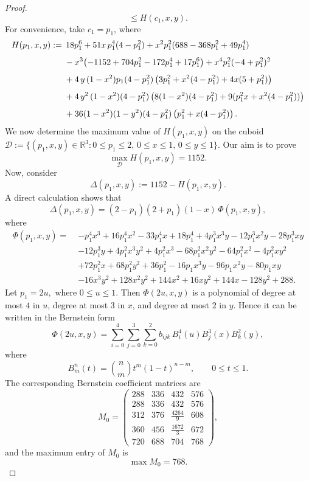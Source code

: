 \documentclass[a4paper,12pt,reqno]{amsart}
\numberwithin{equation}{section}
\begin{document}
\begin{proof}
\[		\le H(c_{1},x,y).
		\]
		For convenience, take $c_{1}=p_{1}$, where
		\begin{align}\label{eq:2.6}
			H(p_{1}, x, y) :=\;
			&\,18 p_{1}^{6}
			+ 51x\,p_{1}^{4}(4 - p_{1}^{2})
			+ x^{2} p_{1}^{2}(688 - 368 p_{1}^{2} + 49 p_{1}^{4}) \notag\\[4pt]
			& - x^{3}\!\left(-1152 + 704 p_{1}^{2} - 172 p_{1}^{4} + 17 p_{1}^{6}\right)
			+ x^{4} p_{1}^{2}(-4 + p_{1}^{2})^{2} \notag\\[4pt]
			& + 4\, y\,(1 - x^{2}) p_{1}(4 - p_{1}^{2})
			\left(3 p_{1}^{2} + x^{2}(4 - p_{1}^{2}) + 4x(5 + p_{1}^{2})\right) \notag\\[4pt]
			& + 4\,y^{2}\,(1 - x^{2})(4 - p_{1}^{2})
			\left(8(1 - x^{2})(4 - p_{1}^{2})
			+ 9(p_{1}^{2}x + x^{2}(4 - p_{1}^{2}))\right) \notag\\[4pt]
			& + 36(1 - x^{2})(1 - y^{2})(4 - p_{1}^{2})
			\left(p_{1}^{2} + x(4 - p_{1}^{2})\right).
		\end{align}
		We now determine the maximum value of \(H(p_{1},x,y)\) on the cuboid
		$
		\mathcal{D}:=\{(p_1, x, y)\in \mathbb{R}^3: 0\le p_{1}\le 2,\, 0\le x\le 1,\, 0\le y\le 1\}.
		$
		Our aim is to prove 
		\[
		\max_{\mathcal{D}} H(p_{1},x,y)=1152.
		\]
		Now, consider
		\[
		\Delta(p_{1},x,y):=1152-H(p_{1},x,y).
		\]
		A direct calculation shows that
		\[
		\Delta(p_{1},x,y)
		=(2-p_{1})(2+p_{1})(1-x)\,\Phi(p_{1},x,y),
		\]
		where
		\[
		\begin{aligned}
			\Phi(p_{1},x,y)=\;&
			-p_{1}^{4}x^{3}+16p_{1}^{4}x^{2}-33p_{1}^{4}x+18p_{1}^{4} +4p_{1}^{3}x^{3}y-12p_{1}^{3}x^{2}y-28p_{1}^{3}xy\\
			&-12p_{1}^{3}y +4p_{1}^{2}x^{3}y^{2}+4p_{1}^{2}x^{3}-68p_{1}^{2}x^{2}y^{2}-64p_{1}^{2}x^{2} -4p_{1}^{2}xy^{2}\\
			&+72p_{1}^{2}x+68p_{1}^{2}y^{2}+36p_{1}^{2}-16p_{1}x^{3}y-96p_{1}x^{2}y-80p_{1}xy \\
			&-16x^{3}y^{2}+128x^{2}y^{2}+144x^{2}+16xy^{2}+144x-128y^{2}+288 .
		\end{aligned}
		\]
		Let
		$
		p_{1}=2u,$  where $0\le u\le 1.
		$
		Then \(\Phi(2u,x,y)\) is a polynomial of degree at most \(4\) in \(u\), degree at most \(3\) in \(x\), and degree at most \(2\) in \(y\). Hence it can be written in the Bernstein form
		\[
		\Phi(2u,x,y)
		=
		\sum_{i=0}^{4}\sum_{j=0}^{3}\sum_{k=0}^{2}
		b_{ijk}\,B_{i}^{4}(u)B_{j}^{3}(x)B_{k}^{2}(y),
		\]
		where
		\[
		B_{m}^{n}(t)=\binom{n}{m}t^{m}(1-t)^{n-m},\qquad 0\le t\le 1.
		\]
		The corresponding Bernstein coefficient matrices are
		\[
		M_{0}=
		\begin{pmatrix}
			288&336&432&576\\[3mm]
			288&336&432&576\\[3mm]
			312&376&\frac{4264}{9}&608\\[3mm]
			360&456&\frac{1672}{3}&672\\[3mm]
			720&688&704&768
		\end{pmatrix},
		\]
		and the maximum entry of \(M_{0}\) is
		\[
		\max M_{0}=768.
		\]
		

\end{proof}
\end{document}
